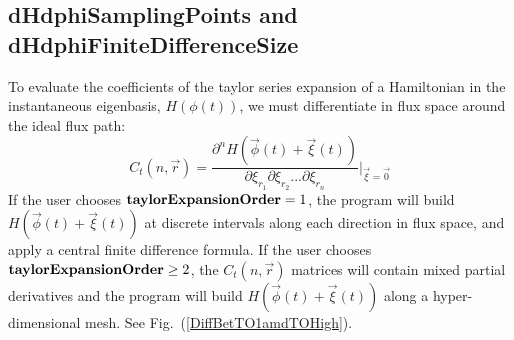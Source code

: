 \documentclass[12pt]{article}
\begin{document}
\subsection{dHdphiSamplingPoints and dHdphiFiniteDifferenceSize}
To evaluate the coefficients of the taylor series expansion of a Hamiltonian in the instantaneous eigenbasis, $H(\phi(t))$, we must differentiate in flux space around the ideal flux path:
\begin{equation}
C_t(n,\vec{r}) = \frac{\partial^n H(\vec{\phi}(t)+ \vec{\xi}(t))} {\partial \xi_{r_1}\partial \xi_{r_2}...\partial \xi_{r_n}}  |_{\vec{\xi}=\vec{0}}
\end{equation}
If the user chooses $\mbox{\textbf{taylorExpansionOrder}} = 1$, the program will build $H(\vec{\phi}(t)+\vec{\xi}(t))$ at discrete intervals along each direction in flux space, and apply a central finite difference formula. If the user chooses $\mbox{\textbf{taylorExpansionOrder}} \geq 2$, the $C_t(n,\vec{r})$ matrices will contain mixed partial derivatives and the program will build $H(\vec{\phi}(t)+\vec{\xi}(t))$ along a hyper-dimensional mesh. See Fig.~(\ref{DiffBetTO1amdTOHigh}).
\newline
\newline
\end{document}
